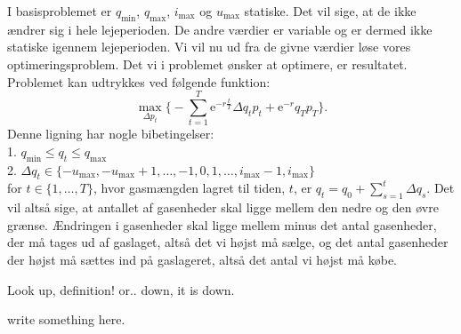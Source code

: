 I basisproblemet er $q_{\min}$, $q_{\max}$, $i_{\max}$ og $u_{\max}$ statiske. Det vil sige, at de ikke ændrer sig i hele lejeperioden. De andre værdier er variable og er dermed ikke statiske igennem lejeperioden. Vi vil nu ud fra de givne værdier løse vores optimeringsproblem. Det vi i problemet ønsker at optimere, er resultatet. Problemet kan udtrykkes ved følgende funktion:
\begin{equation}
\max_{\Delta p_{t}} \Bigg\{ -\sum_{t=1}^{T} \mathrm{e}^{-r\frac{t}{T}} \Delta q_{t} p_{t}+ \mathrm{e}^{-r}q_{T}p_{T} \Bigg\}.
\end{equation}
Denne ligning har nogle bibetingelser:\\
1. $q_{\min} \leq q_{t} \leq q_{\max}$\\
2. $\Delta q_{t} \in \{-u_{\max},-u_{\max}+1,\dotsc,-1,0,1,\dotsc,i_{\max}-1,i_{\max} \}$ \\
for $t \in \{1,\dotsc,T\}$, hvor gasmængden lagret til tiden, $t$, er $q_{t}=q_{0}+\sum_{s=1}^{t} \Delta q_{s}$.
Det vil altså sige, at antallet af gasenheder skal ligge mellem den nedre og den øvre grænse. Ændringen i gasenheder skal ligge mellem minus det antal gasenheder, der må tages ud af gaslaget, altså det vi højst må sælge, og det antal gasenheder der højst må sættes ind på gaslageret, altså det antal vi højst må købe.

Look up, definition!
or.. down, it is down.

\begin{defn}
write something here.
\end{defn}